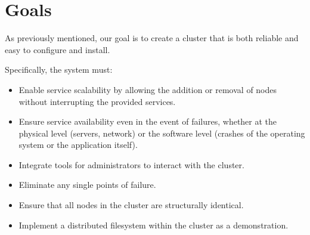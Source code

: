 \section{Goals}
As previously mentioned, our goal is to create a cluster that is both reliable and easy to configure and install.

Specifically, the system must:
\begin{itemize}
	\item Enable service scalability by allowing the addition or removal of nodes without interrupting the provided services.
	\item Ensure service availability even in the event of failures, whether at the physical level (servers, network) or the software level (crashes of the operating system or the application itself).
	\item Integrate tools for administrators to interact with the cluster.
	\item Eliminate any single points of failure.
	\item Ensure that all nodes in the cluster are structurally identical.
	\item Implement a distributed filesystem within the cluster as a demonstration.
\end{itemize}
    





